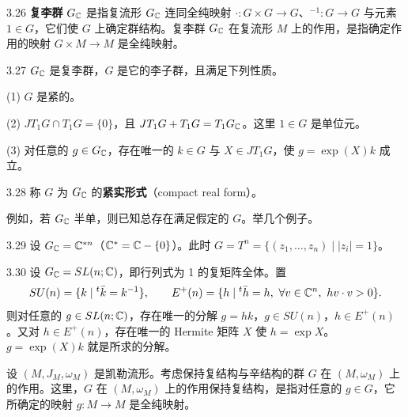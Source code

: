 \begin{definition}{3.26}
  \textbf{复李群} $G_{\mathbb{C}}$ 是指复流形 $G_{\mathbb{C}}$ 连同全纯映射 $\cdot\colon G\times G\to G$、$^{-1}\colon G\to G$ 与元素 $1\in G$，它们使 $G$ 上确定群结构。复李群 $G_{\mathbb{C}}$ 在复流形 $M$ 上的作用，是指确定作用的映射 $G\times M\to M$ 是全纯映射。
\end{definition}

\begin{assumption}{3.27}
  $G_{\mathbb{C}}$ 是复李群，$G$ 是它的李子群，且满足下列性质。

  (1) $G$ 是紧的。

  (2) $JT_1G\cap T_1G=\{0\}$，且 $JT_1G+T_1G=T_1G_{\mathbb{C}}$。这里 $1\in G$ 是单位元。

  (3) 对任意的 $g\in G_{\mathbb{C}}$，存在唯一的 $k\in G$ 与 $X\in JT_1G$，使 $g=\exp(X)k$ 成立。
\end{assumption}

\begin{definition}{3.28}
  称 $G$ 为 $G_{\mathbb{C}}$ 的\textbf{紧实形式}（compact real form）。
\end{definition}


例如，若 $G_{\mathbb{C}}$ 半单，则已知总存在满足假定的 $G$。举几个例子。

\begin{example}{3.29}
  设 $G_{\mathbb{C}}=\mathbb{C}^{*n}$（$\mathbb{C}^*=\mathbb{C}-\{0\}$）。此时 $G=T^n=\{(z_1,\dots,z_n)\mid|z_i|=1\}$。
\end{example}

\begin{example}{3.30}
  设 $G_{\mathbb{C}}=SL(n;\mathbb{C})$，即行列式为 1 的复矩阵全体。置
  \[
    SU(n)=\{k\mid{}^t\bar k=k^{-1}\},\qquad
    E^{+}(n)=\{h\mid{}^t\bar h=h,\ \forall v\in\mathbb{C}^n,\ hv\cdot v>0\}.
  \]
  则对任意的 $g\in SL(n;\mathbb{C})$，存在唯一的分解 $g=hk$，$g\in SU(n)$，$h\in E^{+}(n)$。又对 $h\in E^{+}(n)$，存在唯一的 Hermite 矩阵 $X$ 使 $h=\exp X$。$g=\exp(X)k$ 就是所求的分解。
\end{example}

设 $(M,J_M,\omega_M)$ 是凯勒流形。考虑保持复结构与辛结构的群 $G$ 在 $(M,\omega_M)$ 上的作用。这里，$G$ 在 $(M,\omega_M)$ 上的作用保持复结构，是指对任意的 $g\in G$，它所确定的映射 $g\colon M\to M$ 是全纯映射。


